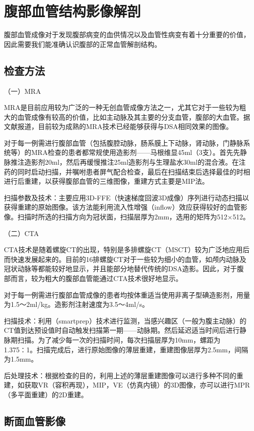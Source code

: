 \chapter{腹部血管结构影像解剖}

腹部血管成像对于发现腹部病变的血供情况以及血管性病变有着十分重要的价值，因此需要我们能准确认识腹部的正常血管解剖结构。

\section{检查方法}

（一）MRA

MRA是目前应用较为广泛的一种无创血管成像方法之一，尤其它对于一些较为粗大的血管成像有较高的价值，比如主动脉及其主要的分支血管，腹部的大血管。据文献报道，目前较为成熟的MRA技术已经能够获得与DSA相同效果的图像。

对于每一例需进行腹部血管（包括腹腔动脉，肠系膜上下动脉，肾动脉，门静脉系统等）的MRA检查的患者都常规使用造影剂------马根维显45ml（3支）。首先先静脉推注造影剂20ml，然后再缓慢推注25ml造影剂与生理盐水30ml的混合液。在注药的同时启动扫描，并嘱咐患者屏气配合检查，最后在扫描结束后选择最佳的时相进行后重建，以获得腹部血管的三维图像，重建方式主要是MIP法。

扫描参数及技术：主要应用3D-FFE（快速梯度回波3D成像）序列进行动态扫描以获得重建的原始图像。该方法能利用流入性增强（inflow）效应获得较好的血管影像。扫描时所选的扫描方向为冠状面，扫描层厚为2mm，选用的矩阵为512×512。

（二）CTA

CTA技术是随着螺旋CT的出现，特别是多排螺旋CT（MSCT）较为广泛地应用后而快速发展起来的。目前的16排螺旋CT对于一些较为细小的血管，如颅内动脉及冠状动脉等都能较好地显示，并且能部分地替代传统的DSA造影。因此，对于腹部而言，较为粗大的腹部血管能通过CTA技术很好地显示。

对于每一例需进行腹部血管成像的患者均按体重适当使用非离子型碘造影剂，用量为1.5～2ml/kg。造影剂注射速度为3.5～4ml/s。

扫描技术：利用（smartprep）技术进行监测，当感兴趣区（一般为腹主动脉）的CT值到达预设值时自动触发扫描第一期------动脉期。然后延迟适当时间后进行静脉期扫描。为了减少每一次的扫描时间，每次扫描层厚为10mm，螺距为1.375∶1。扫描完成后，进行原始图像的薄层重建，重建图像层厚为2.5mm，间隔为1.5mm。

后处理技术：根据检查的目的，利用上述的薄层重建图像可以进行多种不同的重建，如获取VR（容积再现），MIP，VE（仿真内镜）的3D图像，亦可以进行MPR（多平面重建）的2D重建。

\section{断面血管影像}

